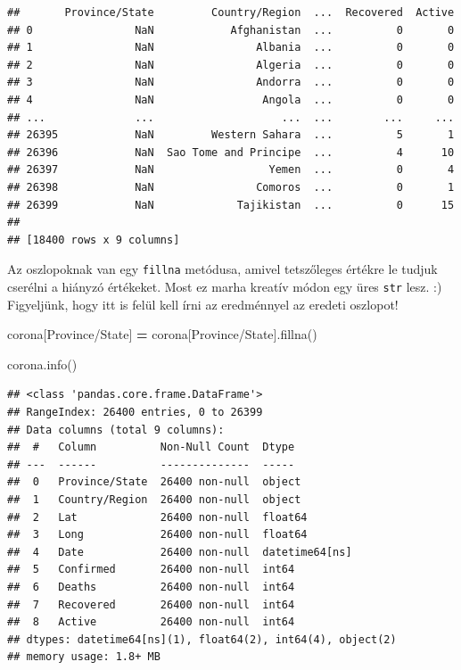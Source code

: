 \documentclass[
]{book}
\newenvironment{Shaded}{\begin{snugshade}}{\end{snugshade}}
\newcommand{\NormalTok}[1]{#1}
\newcommand{\OperatorTok}[1]{\textcolor[rgb]{0.81,0.36,0.00}{\textbf{#1}}}
\newcommand{\StringTok}[1]{\textcolor[rgb]{0.31,0.60,0.02}{#1}}
\begin{document}
\begin{verbatim}
##       Province/State         Country/Region  ...  Recovered  Active
## 0                NaN            Afghanistan  ...          0       0
## 1                NaN                Albania  ...          0       0
## 2                NaN                Algeria  ...          0       0
## 3                NaN                Andorra  ...          0       0
## 4                NaN                 Angola  ...          0       0
## ...              ...                    ...  ...        ...     ...
## 26395            NaN         Western Sahara  ...          5       1
## 26396            NaN  Sao Tome and Principe  ...          4      10
## 26397            NaN                  Yemen  ...          0       4
## 26398            NaN                Comoros  ...          0       1
## 26399            NaN             Tajikistan  ...          0      15
## 
## [18400 rows x 9 columns]
\end{verbatim}

Az oszlopoknak van egy \texttt{fillna} metódusa, amivel tetszőleges értékre le tudjuk cserélni a hiányzó értékeket. Most ez marha kreatív módon egy üres \texttt{str} lesz. :)
Figyeljünk, hogy itt is felül kell írni az eredménnyel az eredeti oszlopot!

\begin{Shaded}
\begin{Highlighting}[]
\NormalTok{corona[}\StringTok{\textquotesingle{}Province/State\textquotesingle{}}\NormalTok{] }\OperatorTok{=}\NormalTok{ corona[}\StringTok{\textquotesingle{}Province/State\textquotesingle{}}\NormalTok{].fillna(}\StringTok{\textquotesingle{}\textquotesingle{}}\NormalTok{)}

\NormalTok{corona.info()}
\end{Highlighting}
\end{Shaded}

\begin{verbatim}
## <class 'pandas.core.frame.DataFrame'>
## RangeIndex: 26400 entries, 0 to 26399
## Data columns (total 9 columns):
##  #   Column          Non-Null Count  Dtype         
## ---  ------          --------------  -----         
##  0   Province/State  26400 non-null  object        
##  1   Country/Region  26400 non-null  object        
##  2   Lat             26400 non-null  float64       
##  3   Long            26400 non-null  float64       
##  4   Date            26400 non-null  datetime64[ns]
##  5   Confirmed       26400 non-null  int64         
##  6   Deaths          26400 non-null  int64         
##  7   Recovered       26400 non-null  int64         
##  8   Active          26400 non-null  int64         
## dtypes: datetime64[ns](1), float64(2), int64(4), object(2)
## memory usage: 1.8+ MB
\end{verbatim}
\end{document}
